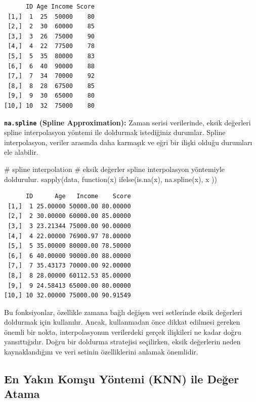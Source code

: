 \documentclass[
  letterpaper,
  DIV=11,
  numbers=noendperiod]{scrreprt}
\newenvironment{Shaded}{\begin{snugshade}}{\end{snugshade}}
\newcommand{\CommentTok}[1]{\textcolor[rgb]{0.37,0.37,0.37}{#1}}
\newcommand{\ControlFlowTok}[1]{\textcolor[rgb]{0.00,0.23,0.31}{#1}}
\newcommand{\FunctionTok}[1]{\textcolor[rgb]{0.28,0.35,0.67}{#1}}
\newcommand{\NormalTok}[1]{\textcolor[rgb]{0.00,0.23,0.31}{#1}}
\begin{document}
\begin{verbatim}
      ID Age Income Score
 [1,]  1  25  50000    80
 [2,]  2  30  60000    85
 [3,]  3  26  75000    90
 [4,]  4  22  77500    78
 [5,]  5  35  80000    83
 [6,]  6  40  90000    88
 [7,]  7  34  70000    92
 [8,]  8  28  67500    85
 [9,]  9  30  65000    80
[10,] 10  32  75000    80
\end{verbatim}

\textbf{\texttt{na.spline} (Spline Approximation):} Zaman serisi
verilerinde, eksik değerleri spline interpolasyon yöntemi ile doldurmak
istediğiniz durumlar. Spline interpolasyon, veriler arasında daha
karmaşık ve eğri bir ilişki olduğu durumları ele alabilir.

\begin{Shaded}
\begin{Highlighting}[]
\CommentTok{\# spline interpolation}
\CommentTok{\# eksik değerler spline interpolasyon yöntemiyle doldurulur.}
\FunctionTok{sapply}\NormalTok{(data, }\ControlFlowTok{function}\NormalTok{(x) }\FunctionTok{ifelse}\NormalTok{(}\FunctionTok{is.na}\NormalTok{(x), }\FunctionTok{na.spline}\NormalTok{(x), x ))}
\end{Highlighting}
\end{Shaded}

\begin{verbatim}
      ID      Age   Income    Score
 [1,]  1 25.00000 50000.00 80.00000
 [2,]  2 30.00000 60000.00 85.00000
 [3,]  3 23.21344 75000.00 90.00000
 [4,]  4 22.00000 76900.97 78.00000
 [5,]  5 35.00000 80000.00 78.50000
 [6,]  6 40.00000 90000.00 88.00000
 [7,]  7 35.43173 70000.00 92.00000
 [8,]  8 28.00000 60112.53 85.00000
 [9,]  9 24.58413 65000.00 80.00000
[10,] 10 32.00000 75000.00 90.91549
\end{verbatim}

Bu fonksiyonlar, özellikle zamana bağlı değişen veri setlerinde eksik
değerleri doldurmak için kullanılır. Ancak, kullanmadan önce dikkat
edilmesi gereken önemli bir nokta, interpolasyonun verilerdeki gerçek
ilişkileri ne kadar doğru yansıttığıdır. Doğru bir doldurma stratejisi
seçilirken, eksik değerlerin neden kaynaklandığını ve veri setinin
özelliklerini anlamak önemlidir.

\subsection*{En Yakın Komşu Yöntemi (KNN) ile Değer
Atama}\label{en-yakux131n-komux15fu-yuxf6ntemi-knn-ile-deux11fer-atama}
\end{document}
